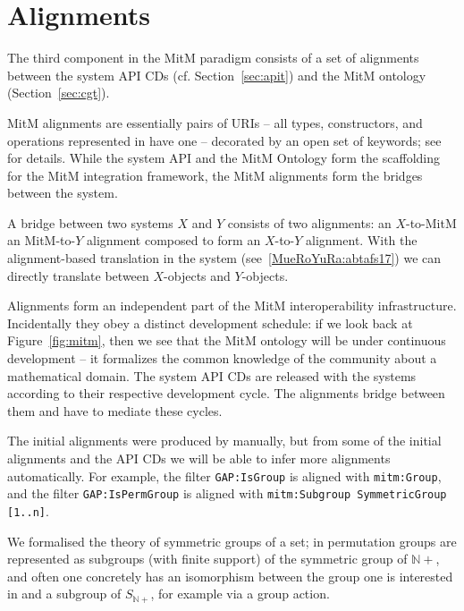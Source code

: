 \section{Alignments}\label{sec:alignments}
The third component in the MitM paradigm consists of a set of alignments between the
system API CDs (cf. Section~\ref{sec:apit}) and the MitM ontology (Section~\ref{sec:cgt}). 

MitM alignments are essentially pairs of \MMT URIs -- all types, constructors, and
operations represented in \OMMT have one -- decorated by an open set of keywords;
see~\cite{MueGauKal:cacfms17} for details. While the system API and the MitM Ontology form
the scaffolding for the MitM integration framework, the MitM alignments form the bridges
between the system.

A bridge between two systems $X$ and $Y$ consists of two alignments: an $X$-to-MitM an
MitM-to-$Y$ alignment composed to form an $X$-to-$Y$ alignment. With the alignment-based
translation in the \MMT system (see~\ref{MueRoYuRa:abtafs17}) we can directly translate
between $X$-objects and $Y$-objects. 

Alignments form an independent part of the MitM interoperability
infrastructure. Incidentally they obey a distinct development schedule: if we look back at
Figure~\ref{fig:mitm}, then we see that the MitM ontology will be under continuous
development -- it formalizes the common knowledge of the community about a mathematical
domain. The system API CDs are released with the systems according to their respective
development cycle. The alignments bridge between them and have to mediate these cycles.

The initial alignments were produced by manually, but from some of the initial alignments
and the \GAP API CDs we will be able to infer more alignments automatically.  For example,
the filter \texttt{GAP:IsGroup} is aligned with
\texttt{mitm:Group}, and the filter \texttt{GAP:IsPermGroup} is aligned with
\texttt{mitm:Subgroup SymmetricGroup [1..n]}.  

We formalised the theory of symmetric groups of a set; in \GAP permutation groups
are represented as subgroups (with finite support) of the symmetric group of
$\mathbb{N}+$, and often one concretely has an isomorphism between the group one
is interested in and a subgroup of $S_{\mathbb{N}+}$, for example
via a group action.

